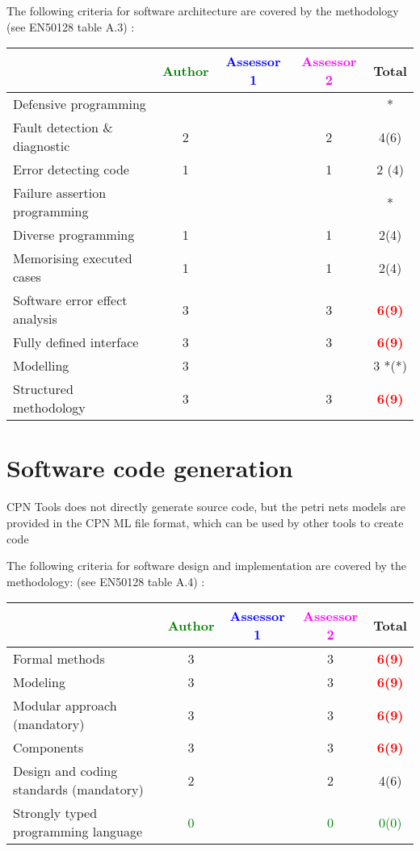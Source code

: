 The following criteria for software architecture are covered by the methodology
(see EN50128 table A.3) :

\begin{tabular}{|l | c | c | c | c|}
\hline
& \textcolor{green}{Author} & \textcolor{blue}{Assessor 1} & \textcolor{magenta}{Assessor 2} & Total \\
\hline
Defensive programming  & & & & * \\
\hline 
Fault detection \& diagnostic  & 2     & & 2     &  4(6) \\
\hline
Error detecting code  & 1     & & 1     & 2 (4) \\
\hline
Failure assertion programming & & & &  * \\
\hline
Diverse programming & 1     & & 1     &  2(4)  \\
\hline
Memorising executed cases & 1     & & 1     &   2(4) \\
\hline
Software error effect analysis & 3     & & 3     & \textcolor{red}{\textbf{6(9)}}   \\
\hline
Fully defined interface & 3     & & 3     & \textcolor{red}{\textbf{6(9)}}   \\
\hline
Modelling  & 3     & & & 3 *(*) \\
\hline
Structured methodology & 3     & & 3     & \textcolor{red}{\textbf{6(9)}}   \\
\hline
\end{tabular}

\section{Software code generation}

CPN Tools does not directly generate source code, but the petri nets models are provided in the CPN ML file format, which can be used by other tools to create code

The following criteria for software design and implementation are covered by the methodology:
(see EN50128 table A.4) :

\begin{tabular}{|l | c | c | c | c|}
\hline
& \textcolor{green}{Author} & \textcolor{blue}{Assessor 1} & \textcolor{magenta}{Assessor 2} & Total \\
\hline
Formal methods  & 3     & & 3     & \textcolor{red}{\textbf{6(9)}}   \\
\hline 
Modeling  & 3     & & 3     & \textcolor{red}{\textbf{6(9)}}   \\
\hline
Modular approach (mandatory) & 3     & & 3     & \textcolor{red}{\textbf{6(9)}}   \\
\hline
Components & 3     & & 3     & \textcolor{red}{\textbf{6(9)}}   \\
\hline
Design and coding standards (mandatory) & 2     & & 2     &  4(6) \\
\hline
Strongly typed programming language & \textcolor{green}{0} & & \textcolor{green}{0} & \textcolor{green}{0(0)}  \\
\hline

\end{tabular}



